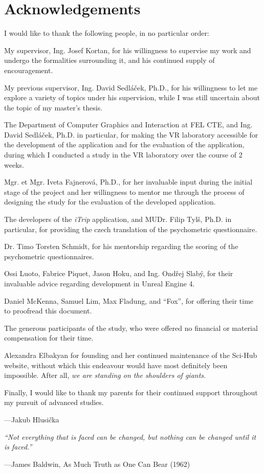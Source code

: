 \chapter*{Acknowledgements}

\begin{small}
I would like to thank the following people, in no particular order:

My supervisor, Ing. Josef Kortan, for his willingness to supervise my work and undergo the formalities surrounding it, and his continued supply of encouragement.

My previous supervisor, Ing. David Sedláček, Ph.D., for his willingness to let me explore a variety of topics under his supervision, while I was still uncertain about the topic of my master's thesis.

The Department of Computer Graphics and Interaction at FEL CTE, and Ing. David Sedláček, Ph.D. in particular, for making the VR laboratory accessible for the development of the application and for the evaluation of the application, during which I conducted a study in the VR laboratory over the course of 2 weeks.

Mgr. et Mgr. Iveta Fajnerová, Ph.D., for her invaluable input during the initial stage of the project and her willingness to mentor me through the process of designing the study for the evaluation of the developed application.

The developers of the \textit{iTrip} application, and MUDr. Filip Tylš, Ph.D. in particular, for providing the czech translation of the psychometric questionnaire.

Dr. Timo Torsten Schmidt, for his mentorship regarding the scoring of the psychometric questionnaires.

Ossi Luoto, Fabrice Piquet, Jason Hoku, and Ing. Ondřej Slabý, for their invaluable advice regarding development in Unreal Engine 4.

Daniel McKenna, Samuel Lim, Max Fladung, and ``Fox'', for offering their time to proofread this document.

The generous participants of the study, who were offered no financial or material compensation for their time.

Alexandra Elbakyan for founding and her continued maintenance of the Sci-Hub website, without which this endeavour would have most definitely been impossible. After all, \textit{we are standing on the shoulders of giants}.

Finally, I would like to thank my parents for their continued support throughout my pursuit of advanced studies.
\end{small}

\begin{flushright}
---Jakub Hlusička
\end{flushright}

\vfill
\begin{center}
{\large
\textit{``Not everything that is faced can be changed, but nothing can be changed until it is faced.''}
}
\end{center}
\begin{flushright}
    ---James Baldwin, As Much Truth as One Can Bear (1962)
\end{flushright}
